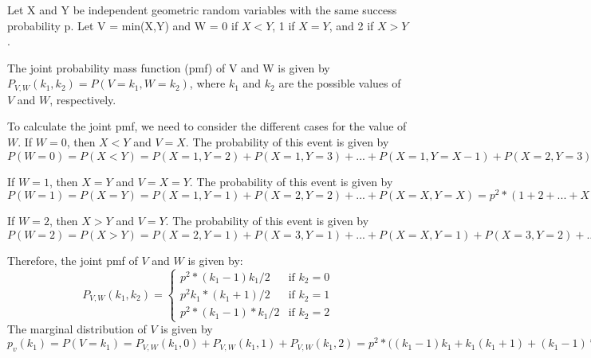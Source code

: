 \documentclass[letterpaper,12pt]{article}
\begin{document}
Let X and Y be independent geometric random variables with the same success probability p. Let V = min(X,Y) and W = 0 if $X<Y$, 1 if $X=Y$, and 2 if $X>Y$.

The joint probability mass function (pmf) of V and W is given by $P_{V,W}(k_1, k_2) = P(V=k_1, W=k_2)$, where $k_1$ and $k_2$ are the possible values of $V$ and $W$, respectively.

To calculate the joint pmf, we need to consider the different cases for the value of $W$. If $W=0$, then $X<Y$ and $V=X$. The probability of this event is given by $P(W=0) = P(X<Y) = P(X=1,Y=2) + P(X=1,Y=3) + ... + P(X=1,Y=X-1) + P(X=2,Y=3) + ... + P(X=2,Y=X-1) + ... + P(X=X-1,Y=X) = p^2*(1 + 2 + ... + (X-1)) = p^2*(X-1)*X/2.$

If $W=1$, then $X=Y$ and $V=X=Y$. The probability of this event is given by $P(W=1) = P(X=Y) = P(X=1,Y=1) + P(X=2,Y=2) + ... + P(X=X,Y=X) = p^2*(1 + 2 + ... + X) = p^2X(X+1)/2.$

If $W=2$, then $X>Y$ and $V=Y$. The probability of this event is given by $P(W=2) = P(X>Y) = P(X=2,Y=1) + P(X=3,Y=1) + ... + P(X=X,Y=1) + P(X=3,Y=2) + ... + P(X=X,Y=2) + ... + P(X=X,Y=X-1) = p^2*(1 + 2 + ... + (X-1)) = p^2*(X-1)*X/2.$

Therefore, the joint pmf of $V$ and $W$ is given by:
\[
P_{V,W}(k_1,k_2) =
\begin{cases}
p^2*(k_1-1)k_1/2 & \text{if $k_2 = 0$} \\
p^2k_1*(k_1+1)/2 & \text{if $k_2 = 1$} \\
p^2*(k_1-1)*k_1/2 & \text{if $k_2 = 2$}
\end{cases}
\]
The marginal distribution of $V$ is given by $p_v(k_1) = P(V=k_1) = P_{V,W}(k_1,0) + P_{V,W}(k_1,1) + P_{V,W}(k_1,2) = p^2*((k_1-1)k_1 + k_1(k_1+1) + (k_1-1)*k_1$
\end{document}
